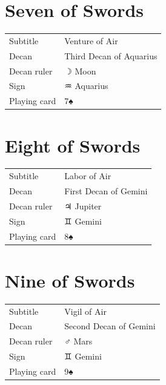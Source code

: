 \newpage
\section*{Seven of Swords}

\begin{center}
\end{center}

\vspace{4mm}
\noindent\begin{tabular}{@{}l@{\quad}l@{}}
Subtitle & Venture of Air \\
Decan & Third Decan of Aquarius \\
Decan ruler & {\symbfont ☽} Moon \\
Sign & {\symbfont ♒} Aquarius \\
Playing card & 7♠ \\
\end{tabular}

\newpage
\section*{Eight of Swords}

\begin{center}
\end{center}

\vspace{4mm}
\noindent\begin{tabular}{@{}l@{\quad}l@{}}
Subtitle & Labor of Air \\
Decan & First Decan of Gemini \\
Decan ruler & {\symbfont ♃} Jupiter \\
Sign & {\symbfont ♊} Gemini \\
Playing card & 8♠ \\
\end{tabular}

\newpage
\section*{Nine of Swords}

\begin{center}
\end{center}

\vspace{4mm}
\noindent\begin{tabular}{@{}l@{\quad}l@{}}
Subtitle & Vigil of Air \\
Decan & Second Decan of Gemini \\
Decan ruler & {\symbfont ♂} Mars \\
Sign & {\symbfont ♊} Gemini \\
Playing card & 9♠ \\
\end{tabular}

